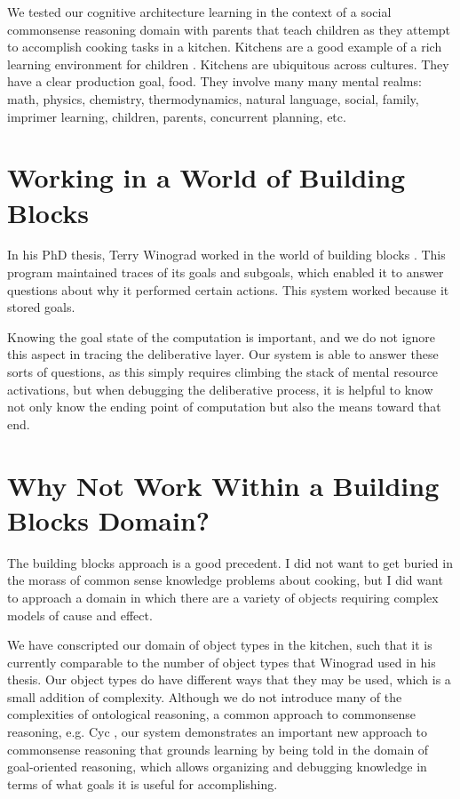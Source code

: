 We tested our cognitive architecture learning in the context of a
social commonsense reasoning domain with parents that teach children
as they attempt to accomplish cooking tasks in a kitchen.  Kitchens
are a good example of a rich learning environment for children
\citep{dewey:1907}.  Kitchens are ubiquitous across cultures.  They
have a clear production goal, food.  They involve many many mental
realms: math, physics, chemistry, thermodynamics, natural language,
social, family, imprimer learning, children, parents, concurrent
planning, etc.

\section{Working in a World of Building Blocks}

In his PhD thesis, Terry Winograd worked in the world of building
blocks \citep{winograd:1970}.  This program maintained traces of its
goals and subgoals, which enabled it to answer questions about why it
performed certain actions.  This system worked because it stored
goals.

Knowing the goal state of the computation is important, and we do not
ignore this aspect in tracing the deliberative layer.  Our system is
able to answer these sorts of questions, as this simply requires
climbing the stack of mental resource activations, but when debugging
the deliberative process, it is helpful to know not only know the
ending point of computation but also the means toward that end.

\section{Why Not Work Within a Building Blocks Domain?}

The building blocks approach is a good precedent.  I did not want to
get buried in the morass of common sense knowledge problems about
cooking, but I did want to approach a domain in which there are a
variety of objects requiring complex models of cause and effect.

We have conscripted our domain of object types in the kitchen, such
that it is currently comparable to the number of object types that
Winograd used in his thesis.  Our object types do have different ways
that they may be used, which is a small addition of complexity.
Although we do not introduce many of the complexities of ontological
reasoning, a common approach to commonsense reasoning, e.g. Cyc
\citep{lenat:1990}, our system demonstrates an important new approach
to commonsense reasoning that grounds learning by being told in the
domain of goal-oriented reasoning, which allows organizing and
debugging knowledge in terms of what goals it is useful for
accomplishing.

